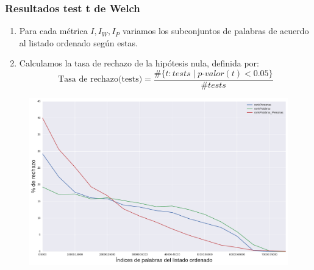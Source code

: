 \begin{frame}[c]\frametitle{Resultados test t de Welch}

  \begin{enumerate}
   
    \item Para cada métrica $I,I_W,I_P$  variamos los subconjuntos de palabras de acuerdo al listado ordenado según estas.
  
    \item Calculamos la tasa de rechazo de la hipótesis nula, definida por:
    \begin{equation}
      \text{Tasa de rechazo(tests)} = \frac{\# \{t:tests \mid p \text{-}valor(t) < 0.05\}}{\#tests} 
    \end{equation}
  
  \end{enumerate}

  \begin{figure}
  \includegraphics[width=0.6\linewidth]{../src/images/rechazo_metricas.pdf}
  
  \end{figure}
            
\end{frame}